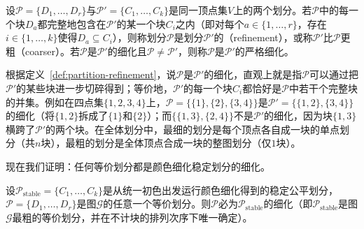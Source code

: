 \begin{definition}[划分的细化]
\label{def:partition-refinement}
设$\mathcal P=\{D_1,\ldots,D_r\}$与$\mathcal P'=\{C_1,\ldots,C_k\}$是同一顶点集$V$上的两个划分。若$\mathcal P$中的每一个块$D_a$都完整地包含在$\mathcal P'$的某一个块$C_i$之内（即对每个$a\in\{1,\ldots,r\}$，存在$i\in\{1,\ldots,k\}$使得$D_a\subseteq C_i$），则称划分$\mathcal P$是划分$\mathcal P'$的（refinement），或称$\mathcal P'$比$\mathcal P$更粗（coarser）。若$\mathcal P$是$\mathcal P'$的细化且$\mathcal P\neq\mathcal P'$，则称$\mathcal P$是$\mathcal P'$的严格细化。
\end{definition}

根据定义~\ref{def:partition-refinement}，说$\mathcal P$是$\mathcal P'$的细化，直观上就是指$\mathcal P$可以通过把$\mathcal P'$的某些块进一步切碎得到；等价地，$\mathcal P'$的每一个块$C_i$都恰好是$\mathcal P$中若干个完整块的并集。例如在四点集$\{1,2,3,4\}$上，$\mathcal P=\bigl\{\{1\},\{2\},\{3,4\}\bigr\}$是$\mathcal P'=\bigl\{\{1,2\},\{3,4\}\bigr\}$的细化（将$\{1,2\}$拆成了$\{1\}$和$\{2\}$）；而$\bigl\{\{1,3\},\{2,4\}\bigr\}$不是$\mathcal P'$的细化，因为块$\{1,3\}$横跨了$\mathcal P'$的两个块。在全体划分中，最细的划分是每个顶点各自成一块的单点划分（共$n$块），最粗的划分是全体顶点合成一块的整图划分（仅$1$块）。

现在我们证明：任何等价划分都是颜色细化稳定划分的细化。

\begin{theorem}[统一初色的稳定划分是最粗等价划分]
\label{thm:color-refinement-coarsest}
设$\mathcal P_{\mathrm{stable}}=\{C_1,\ldots,C_k\}$是从统一初色出发运行颜色细化得到的稳定公平划分，$\mathcal P=\{D_1,\ldots,D_r\}$是图$\mathcal G$的任意一个等价划分。则$\mathcal P$必为$\mathcal P_{\mathrm{stable}}$的细化（即$\mathcal P_{\mathrm{stable}}$是图$\mathcal G$最粗的等价划分，并在不计块的排列次序下唯一确定）。
\end{theorem}

